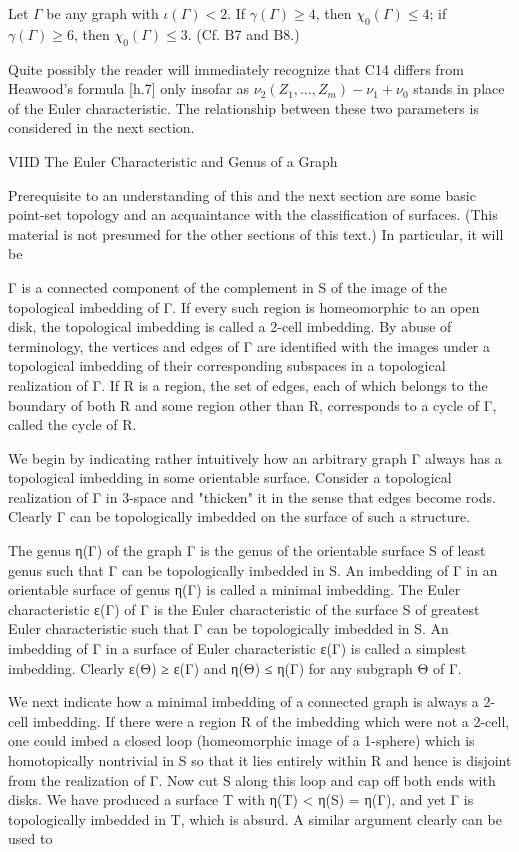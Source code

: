 Let $\Gamma$ be any graph with $\iota(\Gamma) < 2$. If $\gamma(\Gamma) \geq 4$, then $\chi_0(\Gamma) \leq 4$; if $\gamma(\Gamma) \geq 6$, then $\chi_0(\Gamma) \leq 3$. (Cf. B7 and B8.)

Quite possibly the reader will immediately recognize that C14 differs from Heawood's formula [h.7] only insofar as $\nu_2(Z_1, \ldots, Z_m) - \nu_1 + \nu_0$ stands in place of the Euler characteristic. The relationship between these two parameters is considered in the next section.

VIID The Euler Characteristic and Genus of a Graph

Prerequisite to an understanding of this and the next section are some basic point-set topology and an acquaintance with the classification of surfaces. (This material is not presumed for the other sections of this text.) In particular, it will be

Γ is a connected component of the complement in S of the image of the topological imbedding of Γ. If every such region is homeomorphic to an open disk, the topological imbedding is called a 2-cell imbedding. By abuse of terminology, the vertices and edges of Γ are identified with the images under a topological imbedding of their corresponding subspaces in a topological realization of Γ. If R is a region, the set of edges, each of which belongs to the boundary of both R and some region other than R, corresponds to a cycle of Γ, called the cycle of R.

We begin by indicating rather intuitively how an arbitrary graph Γ always has a topological imbedding in some orientable surface. Consider a topological realization of Γ in 3-space and "thicken" it in the sense that edges become rods. Clearly Γ can be topologically imbedded on the surface of such a structure.

The genus η(Γ) of the graph Γ is the genus of the orientable surface S of least genus such that Γ can be topologically imbedded in S. An imbedding of Γ in an orientable surface of genus η(Γ) is called a minimal imbedding. The Euler characteristic ε(Γ) of Γ is the Euler characteristic of the surface S of greatest Euler characteristic such that Γ can be topologically imbedded in S. An imbedding of Γ in a surface of Euler characteristic ε(Γ) is called a simplest imbedding. Clearly ε(Θ) ≥ ε(Γ) and η(Θ) ≤ η(Γ) for any subgraph Θ of Γ.

We next indicate how a minimal imbedding of a connected graph is always a 2-cell imbedding. If there were a region R of the imbedding which were not a 2-cell, one could imbed a closed loop (homeomorphic image of a 1-sphere) which is homotopically nontrivial in S so that it lies entirely within R and hence is disjoint from the realization of Γ. Now cut S along this loop and cap off both ends with disks. We have produced a surface T with η(T) < η(S) = η(Γ), and yet Γ is topologically imbedded in T, which is absurd. A similar argument clearly can be used to
